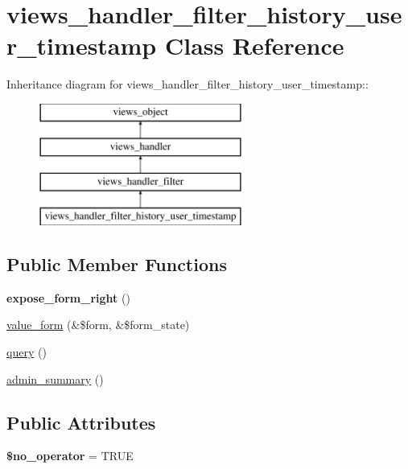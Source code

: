 \hypertarget{classviews__handler__filter__history__user__timestamp}{
\section{views\_\-handler\_\-filter\_\-history\_\-user\_\-timestamp Class Reference}
\label{classviews__handler__filter__history__user__timestamp}
}
Inheritance diagram for views\_\-handler\_\-filter\_\-history\_\-user\_\-timestamp::\begin{figure}[H]
\begin{center}
\leavevmode
\includegraphics[height=4cm]{classviews__handler__filter__history__user__timestamp}
\end{center}
\end{figure}
\subsection*{Public Member Functions}
\begin{CompactItemize}
\item 
\hypertarget{classviews__handler__filter__history__user__timestamp_33c99908629690bbc87d3ce508d27d90}{
\textbf{expose\_\-form\_\-right} ()}
\label{classviews__handler__filter__history__user__timestamp_33c99908629690bbc87d3ce508d27d90}

\item 
\hyperlink{classviews__handler__filter__history__user__timestamp_38401d36304bef8a19184a8e7919427f}{value\_\-form} (\&\$form, \&\$form\_\-state)
\item 
\hyperlink{classviews__handler__filter__history__user__timestamp_c7499e60ca61853a3cd37fcbaa3c0618}{query} ()
\item 
\hyperlink{classviews__handler__filter__history__user__timestamp_a5eeead15fcc3d6e74ca62c31676e109}{admin\_\-summary} ()
\end{CompactItemize}
\subsection*{Public Attributes}
\begin{CompactItemize}
\item 
\hypertarget{classviews__handler__filter__history__user__timestamp_bf922202b8152b4a56464bf0b800cfc0}{
\textbf{\$no\_\-operator} = TRUE}
\label{classviews__handler__filter__history__user__timestamp_bf922202b8152b4a56464bf0b800cfc0}

\end{CompactItemize}


